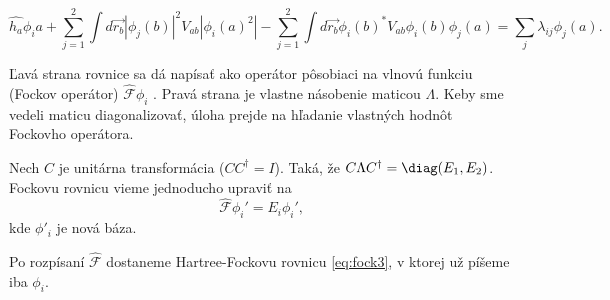 \begin{equation}
 \label{eq:fock1}
 \hat{h_a}\phi_i{a}+\sum_{j=1}^2\int{d\vec{r_b}}|\phi_j(b)|^2V_{ab}|\phi_i(a)^2|-\sum_{j=1}^2\int{d\vec{r_b}}\phi_i(b)^*V_{ab}\phi_i(b)\phi_j(a)=\sum_j{\lambda_{ij}\phi_j(a)}\text{.}
\end{equation}

Ľavá strana rovnice sa dá napísať ako operátor pôsobiaci na vlnovú funkciu (Fockov operátor) $\hat{\mathcal{F}}\phi_i$ . Pravá strana je vlastne násobenie maticou $\Lambda$. Keby sme vedeli maticu
diagonalizovať, úloha prejde na hľadanie vlastných hodnôt Fockovho operátora.

Nech $C$ je unitárna transformácia ($CC^\dagger=I$). Taká, že $C\Lambda C^\dagger=\diag(E_1,E_2)$. Fockovu rovnicu vieme jednoducho upraviť na
\begin{equation}
 \label{eq:fock2}
\hat{\mathcal{F}}\phi_i'=E_i\phi_i' \text{,}
\end{equation}
kde $\phi'_i$ je nová báza.

Po rozpísaní $\hat{\mathcal {F}}$ dostaneme Hartree-Fockovu rovnicu \eqref{eq:fock3}, v ktorej už píšeme iba $\phi_i$.



